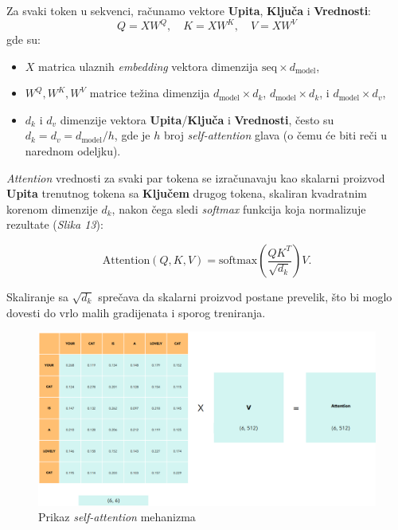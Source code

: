 \documentclass[12pt]{article}
\begin{document}
  Za svaki token u sekvenci, računamo vektore \textbf{Upita}, \textbf{Ključa} i \textbf{Vrednosti}:
   \vspace{-0.2cm} %
  \[
  Q = XW^Q, \quad K = XW^K, \quad V = XW^V
  \]
  \vspace{-0.7cm} %
  gde su:
  \begin{itemize}
   \vspace{0.2cm} %
      \item \( X \) matrica ulaznih \textit{embedding} vektora 
      dimenzija \( \text{seq} \times d_{\text{model}} \),
      \item \( W^Q, W^K, W^V \) matrice težina dimenzija 
      \( d_{\text{model}} \times d_k \), \( d_{\text{model}} \times d_k \), 
      i \( d_{\text{model}} \times d_v \),
      \item \( d_k \) i \( d_v \) dimenzije vektora \textbf{Upita}/\textbf{Ključa} i \textbf{Vrednosti}, 
      često su \\ \( d_k = d_v = d_{\text{model}}/h \), gde je \( h \) 
      broj \textit{self-attention} glava (o čemu će biti reči u narednom odeljku).
  \end{itemize}
  
  \textit{Attention} vrednosti za svaki par tokena se izračunavaju kao skalarni proizvod 
  \textbf{Upita} trenutnog tokena sa \textbf{Ključem} drugog tokena, 
  skaliran kvadratnim korenom dimenzije \( d_k \), nakon čega sledi \textit{softmax} 
  funkcija koja normalizuje rezultate (\textit{Slika 13}):
  
  \vspace{-0.7cm} %
  \[
  \text{Attention}(Q, K, V) = \text{softmax}\left(\frac{QK^T}{\sqrt{d_k}}\right)V.
  \]
  \vspace{-0.7cm} %

  Skaliranje sa \( \sqrt{d_k} \) sprečava da skalarni proizvod postane prevelik, 
  što bi moglo dovesti do vrlo malih gradijenata i sporog treniranja.

   \begin{figure}[h!]
   \centering
   \includegraphics[width=1.1\textwidth]{self_attention.png}
   \caption{Prikaz \textit{self-attention} mehanizma \cite{transformer}}
   \label{fig:self_attention}
   \end{figure}
\end{document}
